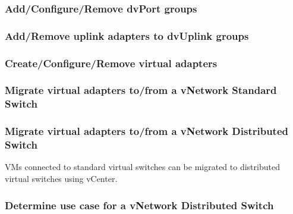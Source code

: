 \subsubsection{Add/Configure/Remove dvPort groups}

\subsubsection{Add/Remove uplink adapters to dvUplink groups}

\subsubsection{Create/Configure/Remove virtual adapters}

\subsubsection{Migrate virtual adapters to/from a vNetwork Standard Switch}

\subsubsection{Migrate virtual adapters to/from a vNetwork Distributed Switch}

VMs connected to standard virtual switches can be migrated to distributed
virtual switches using vCenter.

\subsubsection{Determine use case for a vNetwork Distributed Switch}
